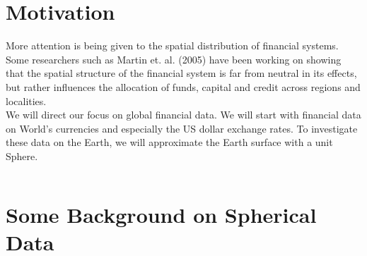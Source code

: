 \documentclass[a0,landscape]{a0poster}
\begin{document}

\begin{multicols}{4} %


\section*{\color{red}Motivation}
{
\textbullet More attention is being given to  the spatial distribution of financial systems. Some researchers such as Martin et. al. (2005){\cite{R.Martin}} have been working on showing that the spatial structure of the financial system is far from neutral in its effects, but rather influences the allocation of funds, capital and credit across regions and localities.\\
\textbullet  We will direct our focus on global financial data. We will start with financial data on World's currencies and especially the US dollar exchange rates. To investigate these data on the Earth, we will approximate the Earth surface with a unit Sphere.

{
    \begin{tabular}{c  c}
    \end{tabular}
 }
 }

%	


\section*{\color{red}Some Background on Spherical Data}

%	


\end{multicols}
\end{document}
